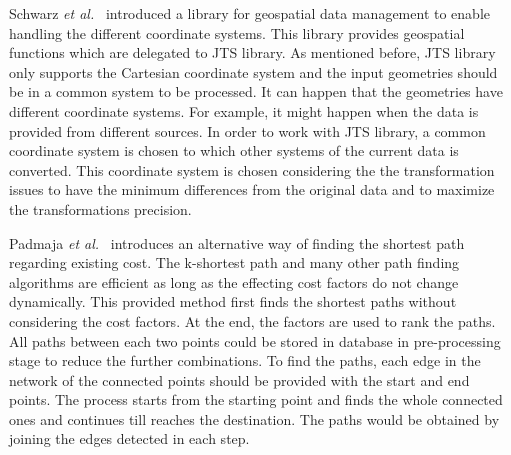 \documentclass[a4paper,12pt]{article}
\begin{document}
Schwarz \emph{et al.}~\cite{Schwarz2004} introduced a library for geospatial data management to enable handling the different coordinate systems. This library provides geospatial functions which are delegated to JTS library. As mentioned before, JTS library only supports the Cartesian coordinate system and the input geometries should be in a common system to be processed. It can happen that the geometries have different coordinate systems. For example, it might happen when the data is provided from different sources. In order to work with JTS library, a common coordinate system is chosen to which other systems of the current data is converted. This coordinate system is chosen considering the the transformation issues to have the minimum differences from the original data and to maximize the transformations precision.


Padmaja \emph{et al.}~\cite{short-path} introduces an alternative way of finding the shortest path regarding existing cost. The k-shortest path and many other path finding algorithms are efficient as long as the effecting cost factors do not change dynamically. This provided method first finds the shortest paths without considering the cost factors. At the end, the factors are used to rank the paths. All paths between each two points could be stored in database in pre-processing stage to reduce the further combinations. To find the paths, each edge in the network of the connected points should be provided with the start and end points. The process starts from the starting point and finds the whole connected ones and continues till reaches the destination. The paths would be obtained by joining the edges detected in each step.
















\newpage
\end{document}
